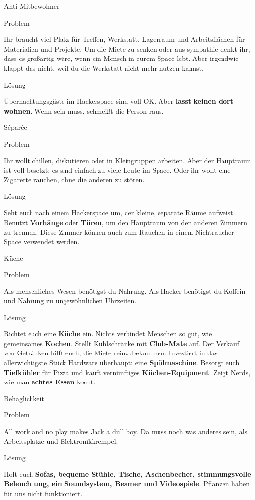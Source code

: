 \documentclass{beamer}
\newcommand{\pattern}[2]{
  \begin{alertblock}{Problem}
    #1
  \end{alertblock}
  \pause
  \begin{exampleblock}{Lösung}
    #2
  \end{exampleblock}
}
\begin{document}
  \begin{frame}{Anti-Mitbewohner}
    \pattern{
      Ihr braucht viel Platz für Treffen, Werkstatt, Lagerraum und
      Arbeitsflächen für Materialien und Projekte. Um die Miete zu senken oder
      aus sympathie denkt ihr, dass es großartig wäre, wenn ein Mensch in eurem
      Space lebt. Aber irgendwie klappt das nicht, weil du die Werkstatt nicht
      mehr nutzen kannst.
    }{
      Übernachtungsgäste im Hackerspace sind voll OK. Aber \textbf{lasst keinen
      dort wohnen}. Wenn sein muss, schmeißt die Person raus.
    }
  \end{frame}

  \begin{frame}{Séparée}
    \pattern{
      Ihr wollt chillen, diskutieren oder in Kleingruppen arbeiten. Aber der
      Hauptraum ist voll besetzt: es sind einfach zu viele Leute im Space. Oder
      ihr wollt eine Zigarette rauchen, ohne die anderen zu stören.
    }{
      Seht euch nach einem Hackerspace um, der kleine, separate Räume aufweist.
      Benutzt \textbf{Vorhänge} oder \textbf{Türen}, um den Hauptraum von den
      anderen Zimmern zu trennen. Diese Zimmer können auch zum Rauchen in einem
      Nichtraucher-Space verwendet werden.
    }
  \end{frame}

  \begin{frame}{Küche}
    \pattern{
      Als menschliches Wesen benötigst du Nahrung. Als Hacker benötigst du
      Koffein und Nahrung zu ungewöhnlichen Uhrzeiten.
    }{
      Richtet euch eine \textbf{Küche} ein. Nichts verbindet Menschen so gut,
      wie gemeinsames \textbf{Kochen}. Stellt Kühlschränke mit
      \textbf{Club-Mate} auf. Der Verkauf von Getränken hilft euch, die Miete
      reinzubekommen. Investiert in das allerwichtigste Stück Hardware
      überhaupt: eine \textbf{Spülmaschine}. Besorgt euch \textbf{Tiefkühler}
      für Pizza und kauft vernünftiges \textbf{Küchen-Equipment}. Zeigt Nerds,
      wie man \textbf{echtes Essen} kocht.
    }
  \end{frame}

  \begin{frame}{Behaglichkeit}
    \pattern{
      All work and no play makes Jack a dull boy. Da muss noch was anderes sein,
      als Arbeitsplätze und Elektronikkrempel.
    }{
      Holt euch \textbf{Sofas, bequeme Stühle, Tische, Aschenbecher,
      stimmungsvolle Beleuchtung, ein Soundsystem, Beamer und Videospiele}.
      Pflanzen haben für uns nicht funktioniert.
    }
  \end{frame}
\end{document}
